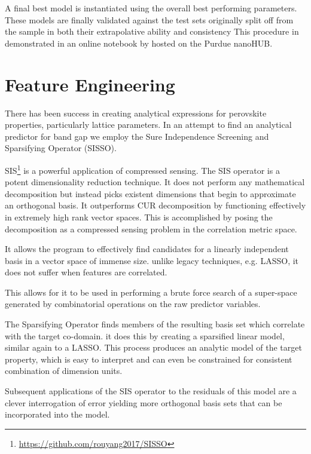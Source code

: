 A final best model is instantiated using the overall best performing parameters.
These models are finally validated against the test sets originally split off from the sample in both their extrapolative ability and consistency 
This procedure in demonstrated in an online notebook by \textcite{manganaris-2022-mrs-comput} hosted on the Purdue nanoHUB.

\section{Feature Engineering}
\label{sec:orgeb8814f}
There has been success in creating analytical expressions for perovskite properties, particularly lattice parameters.
\autocite{jiang-2006-predic-lattic} In an attempt to find an analytical predictor for band gap we employ the Sure Independence Screening and Sparsifying Operator (SISSO).
\autocite{ouyang-2018-sisso} 

SIS\footnote{\url{https://github.com/rouyang2017/SISSO}} is a powerful application of compressed sensing.
\autocite{ghiringhelli-2017-learn-physic}
The SIS operator is a potent dimensionality reduction technique.
It does not perform any mathematical decomposition but instead picks existent dimensions that begin to approximate an orthogonal basis.
It outperforms CUR decomposition by functioning effectively in extremely high rank vector spaces.
\autocite{ray-2021-various-dimen,hamm-2019-cur-decom}
This is accomplished by posing the decomposition as a compressed sensing problem in the correlation metric space.

It allows the program to effectively find candidates for a linearly independent basis in a vector space of immense size.
unlike legacy techniques, e.g.
LASSO, it does not suffer when features are correlated.
\autocite{tibshirani-1996-regres-shrin,gauraha-2018-introd-to-lasso}

This allows for it to be used in performing a brute force search of a super-space generated by combinatorial operations on the raw predictor variables.

The Sparsifying Operator finds members of the resulting basis set which correlate with the target co-domain.
it does this by creating a sparsified linear model, similar again to a LASSO.
This process produces an analytic model of the target property, which is easy to interpret and can even be constrained for consistent combination of dimension units.

Subsequent applications of the SIS operator to the residuals of this model are a clever interrogation of error yielding more orthogonal basis sets that can be incorporated into the model.
\autocite{mayo-1998-error-growt}


